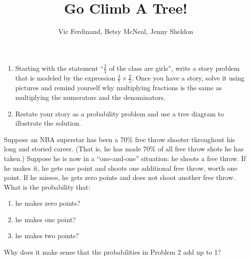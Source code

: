 \documentclass{ximera}
\title{Go Climb A Tree!}
\author{Vic Ferdinand, Betsy McNeal, Jenny Sheldon}
\begin{document}
\begin{abstract}
\end{abstract}
\maketitle



\begin{problem}
\begin{enumerate}
\item Starting with the statement ``$\frac25$ of the class are girls'', write a story problem that is modeled by the expression $\frac37 \times \frac25$.  Once you have a story, solve it using pictures and remind yourself why multiplying fractions is the same as multiplying the numerators and the denominators.
\item Restate your story as a probability problem and use a tree diagram to illustrate the solution.
\end{enumerate}
\end{problem}
\vfill
\begin{problem}\label{NBAStar}
Suppose an NBA superstar has been a 70\% free throw shooter throughout his long and storied career.  (That is, he has made 70\% of all free throw shots he has taken.)  Suppose he is now in a ``one-and-one'' situation: he shoots a free throw.  If he makes it, he gets one point and shoots one additional free throw, worth one point.  If he misses, he gets zero points and does not shoot another free throw.  What is the probability that:
\begin{enumerate}
\item he makes zero points?
\item he makes one point?
\item he makes two points?
\end{enumerate}
\end{problem}
\vfill
\begin{problem}
Why does it make sense that the probabilities in Problem 2 add up to 1?
\end{problem}
\vfill
\newpage
\end{document}
